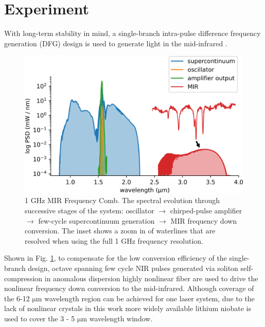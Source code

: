 \documentclass{optica-article}
\begin{document}


\section{Experiment}


With long-term stability in mind, a single-branch intra-pulse difference frequency generation (DFG) design is used to generate light in the mid-infrared \cite{hoghooghi_broadband_2022}. 
% 
\begin{figure}[h]
    \centering
    \includegraphics[width=\linewidth]{spectrum_in_setup.png}
    \caption{1 GHz MIR Frequency Comb. The spectral evolution through successive stages of the system: oscillator $\rightarrow$ chirped-pulse amplifier $\rightarrow$ few-cycle supercontinuum generation $\rightarrow$ MIR frequency down conversion. The inset shows a zoom in of waterlines that are resolved when using the full 1 GHz frequency resolution.}
    \label{fig:spectrum_in_setup}
\end{figure}
%
Shown in Fig. \ref{fig:spectrum_in_setup}, to compensate for the low conversion efficiency of the single-branch design, octave spanning few cycle NIR pulses generated via soliton self-compression in anomalous dispersion highly nonlinear fiber are used to drive the nonlinear frequency down conversion to the mid-infrared. Although coverage of the 6-12 $\mathrm{\mu m}$ wavelength region can be achieved for one laser system, due to the lack of nonlinear crystals in this work more widely available lithium niobate is used to cover the 3 - 5 $\mathrm{\mu m}$ wavelength window.
\end{document}
